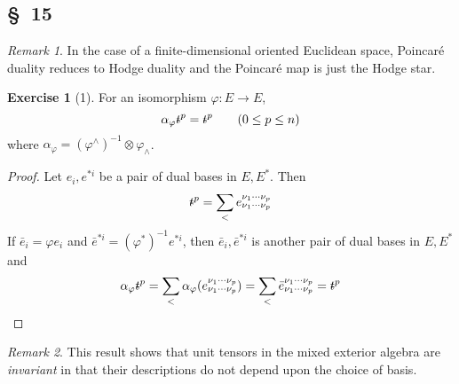 \documentclass[letterpaper,12pt]{article}
\newcommand{\tprod}{\otimes}
\newcommand{\eprod}{\wedge}
\newcommand{\stroked}[1]{\mathrlap{\text{\kern0.05em-}}#1}
\newcommand{\unit}{\stroked{t}}
\theoremstyle{definition}
\newtheorem*{exer}{Exercise}
\theoremstyle{remark}
\newtheorem*{rmk}{Remark}
\begin{document}
\subsection*{\S~15}
\begin{rmk}
In the case of a finite-dimensional oriented Euclidean space, Poincar\'e duality reduces to Hodge duality and the Poincar\'e map is just the Hodge star.
\end{rmk}

\begin{exer}[1]
For an isomorphism \(\varphi:E\to E\),
\[\alpha_{\varphi}\unit^p=\unit^p\qquad(0\le p\le n)\]
where \(\alpha_{\varphi}=(\varphi^{\eprod})^{-1}\tprod\varphi_{\eprod}\).
\end{exer}
\begin{proof}
Let \(e_i,e^{*i}\) be a pair of dual bases in \(E,E^*\). Then
\[\unit^p=\sum_{<}e^{\nu_1\cdots\nu_p}_{\nu_1\cdots\nu_p}\]
If \(\bar{e}_i=\varphi e_i\) and \(\bar{e}^{*i}=(\varphi^*)^{-1}e^{*i}\), then \(\bar{e}_i,\bar{e}^{*i}\) is another pair of dual bases in \(E,E^*\) and
\[\alpha_{\varphi}\unit^p=\sum_{<}\alpha_{\varphi}(e^{\nu_1\cdots\nu_p}_{\nu_1\cdots\nu_p})=\sum_{<}\bar{e}^{\nu_1\cdots\nu_p}_{\nu_1\cdots\nu_p}=\unit^p\qedhere\]
\end{proof}
\begin{rmk}
This result shows that unit tensors in the mixed exterior algebra are \emph{invariant} in that their descriptions do not depend upon the choice of basis.
\end{rmk}
\end{document}
